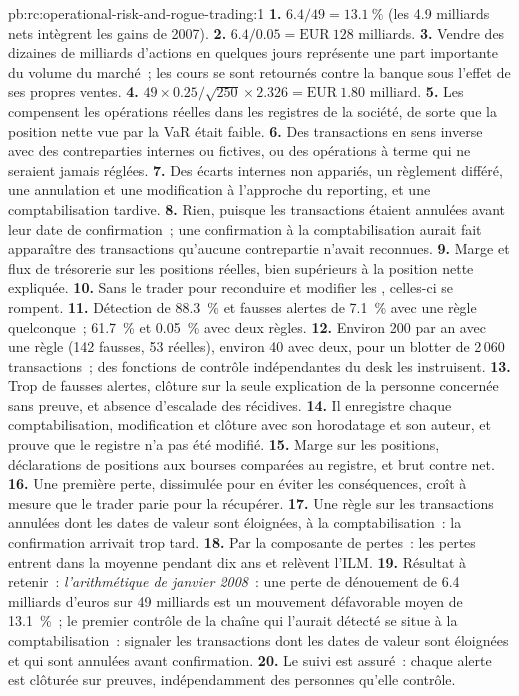 \begin{solution}{pb:rc:operational-risk-and-rogue-trading:1}
\textbf{1.} $6.4/49 = 13.1~\%$ (les 4.9 milliards nets intègrent les gains de 2007).
\textbf{2.} $6.4/0.05 = \text{EUR}~128$ milliards.
\textbf{3.} Vendre des dizaines de milliards d'actions en quelques jours représente une part importante du volume du marché~; les cours
se sont retournés contre la banque sous l'effet de ses propres ventes.
\textbf{4.} $49\times0.25/\sqrt{250}\times2.326 = \text{EUR}~1.80$ milliard.
\textbf{5.} Les  compensent les opérations réelles dans les registres de la société, de sorte que la position nette
vue par la VaR était faible.
\textbf{6.} Des transactions en sens inverse avec des contreparties internes ou fictives, ou des opérations à terme qui
ne seraient jamais réglées.
\textbf{7.} Des écarts internes non appariés, un règlement différé, une annulation et une modification à l'approche du reporting, et une comptabilisation tardive.
\textbf{8.} Rien, puisque les transactions étaient annulées avant leur date de confirmation~; une confirmation à la comptabilisation aurait fait apparaître des transactions qu'aucune contrepartie n'avait reconnues.
\textbf{9.} Marge et flux de trésorerie sur les positions réelles, bien supérieurs à la position nette expliquée.
\textbf{10.} Sans le trader pour reconduire et modifier les , celles-ci se rompent.
\textbf{11.} Détection de 88.3~\% et fausses alertes de 7.1~\% avec une règle quelconque~; 61.7~\% et 0.05~\% avec deux règles.
\textbf{12.} Environ 200 par an avec une règle (142 fausses, 53 réelles), environ 40 avec deux, pour un blotter de
2\,060 transactions~; des fonctions de contrôle indépendantes du desk les instruisent.
\textbf{13.} Trop de fausses alertes, clôture sur la seule explication de la personne concernée sans preuve, et
absence d'escalade des récidives.
\textbf{14.} Il enregistre chaque comptabilisation, modification et clôture avec son horodatage et son auteur, et prouve que
le registre n'a pas été modifié.
\textbf{15.} Marge sur les positions, déclarations de positions aux bourses comparées au registre, et brut contre net.
\textbf{16.} Une première perte, dissimulée pour en éviter les conséquences, croît à mesure que le trader parie pour la récupérer.
\textbf{17.} Une règle sur les transactions annulées dont les dates de valeur sont éloignées, à la comptabilisation~: la confirmation arrivait trop tard.
\textbf{18.} Par la composante de pertes~: les pertes entrent dans la moyenne pendant dix ans et relèvent l'ILM.
\textbf{19.} Résultat à retenir~: \emph{l'arithmétique de janvier 2008}~: une perte de dénouement de 6.4 milliards d'euros sur
49 milliards est un mouvement défavorable moyen de 13.1~\%~; le premier contrôle de la chaîne qui l'aurait détecté se situe à la
comptabilisation~: signaler les transactions dont les dates de valeur sont éloignées et qui sont annulées avant confirmation.
\textbf{20.} Le suivi est assuré~: chaque alerte est clôturée sur preuves, indépendamment des personnes qu'elle contrôle.
\end{solution}

